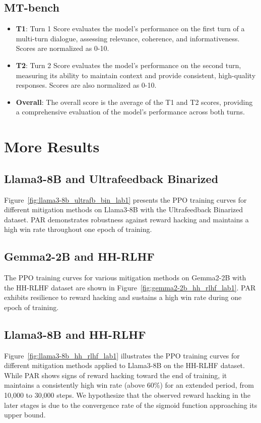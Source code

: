 \subsection*{MT-bench}
\begin{itemize}[leftmargin=*, itemsep=0pt]
    \item \textbf{T1}: Turn 1 Score evaluates the model's performance on the first turn of a multi-turn dialogue, assessing relevance, coherence, and informativeness. Scores are normalized as 0-10.
    \item \textbf{T2}: Turn 2 Score evaluates the model's performance on the second turn, measuring its ability to maintain context and provide consistent, high-quality responses. Scores are also normalized as 0-10.
    \item \textbf{Overall}: The overall score is the average of the T1 and T2 scores, providing a comprehensive evaluation of the model's performance across both turns.
\end{itemize}



\section{More Results}
\subsection{Llama3-8B and Ultrafeedback Binarized}
% 
Figure~\ref{fig:llama3-8b_ultrafb_bin_lab1} presents the PPO training curves for different mitigation methods on Llama3-8B with the Ultrafeedback Binarized dataset. PAR demonstrates robustness against reward hacking and maintains a high win rate throughout one epoch of training.

\subsection{Gemma2-2B and HH-RLHF}
% 
The PPO training curves for various mitigation methods on Gemma2-2B with the HH-RLHF dataset are shown in Figure~\ref{fig:gemma2-2b_hh_rlhf_lab1}. PAR exhibits resilience to reward hacking and sustains a high win rate during one epoch of training.

\subsection{Llama3-8B and HH-RLHF}
% 
Figure~\ref{fig:llama3-8b_hh_rlhf_lab1} illustrates the PPO training curves for different mitigation methods applied to Llama3-8B on the HH-RLHF dataset. While PAR shows signs of reward hacking toward the end of training, it maintains a consistently high win rate (above 60\%) for an extended period, from 10,000 to 30,000 steps. We hypothesize that the observed reward hacking in the later stages is due to the convergence rate of the sigmoid function approaching its upper bound.


